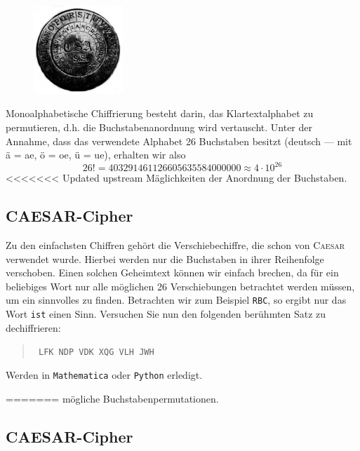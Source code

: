 \documentclass[%
<<<<<<< Updated upstream
11pt,%
twoside,%
titlepage,%
german,%
headsepline%
]{scrartcl}
\begin{document}
\begin{figure}
\vspace{-22pt}
  \begin{center}
    \includegraphics[width=0.3\textwidth]{pictures/Drehsch}
  \end{center}
\vspace{-22pt}
\end{figure}
Monoalphabetische Chiffrierung besteht darin, das Klartextalphabet zu permutieren, d.h. die Buchstabenanordnung wird vertauscht. Unter der Annahme, dass das verwendete Alphabet 26 Buchstaben besitzt (deutsch --- mit ä = ae, ö = oe, ü = ue), erhalten wir also
$$26! = 403291461126605635584000000 \approx 4\cdot10^{26}$$
<<<<<<< Updated upstream
Mäglichkeiten der Anordnung der Buchstaben.

\subsection{CAESAR-Cipher}
Zu den einfachsten Chiffren gehört die Verschiebechiffre, die schon von \textsc{Caesar} verwendet wurde. Hierbei werden nur die Buchstaben in ihrer Reihenfolge verschoben. Einen solchen Geheimtext k\"onnen wir einfach brechen, da für ein beliebiges Wort nur alle möglichen 26
Verschiebungen betrachtet werden müssen, um ein sinnvolles zu finden. Betrachten wir zum Beispiel \texttt{RBC}, so ergibt nur das Wort \texttt{ist} einen Sinn. Versuchen Sie nun den folgenden berühmten Satz zu dechiffrieren:
\begin{quote}
\texttt{
LFK NDP VDK XQG VLH JWH
}
\end{quote}

\begin{ueb}[Caesar]
Werden
in \texttt{Mathematica} oder \texttt{Python} erledigt.
\end{ueb}
=======
mögliche Buchstabenpermutationen.

\subsection{CAESAR-Cipher}
\end{document}
